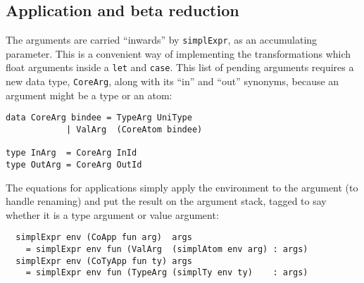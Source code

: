 \documentclass[11pt]{article}
\begin{document}
\subsection{Application and beta reduction}

The arguments are carried ``inwards'' by \texttt{simplExpr}, as an accumulating parameter.
This is a convenient way of implementing the transformations which float
arguments inside a \texttt{let} and \texttt{case}.  This list of pending arguments
requires a new data type, \texttt{CoreArg}, along with its ``in'' and ``out'' synonyms,
because an argument might be a type or an atom:
\begin{lstlisting}
data CoreArg bindee = TypeArg UniType
		    | ValArg  (CoreAtom bindee)

type InArg  = CoreArg InId
type OutArg = CoreArg OutId
\end{lstlisting}
The equations for applications simply apply
the environment to the argument (to handle renaming) and put the result 
on the argument stack, tagged to say whether it is a type argument or value argument:
\begin{lstlisting}
  simplExpr env (CoApp fun arg)  args 
    = simplExpr env fun (ValArg  (simplAtom env arg) : args)
  simplExpr env (CoTyApp fun ty) args 
    = simplExpr env fun (TypeArg (simplTy env ty)    : args)
\end{lstlisting}
\end{document}
